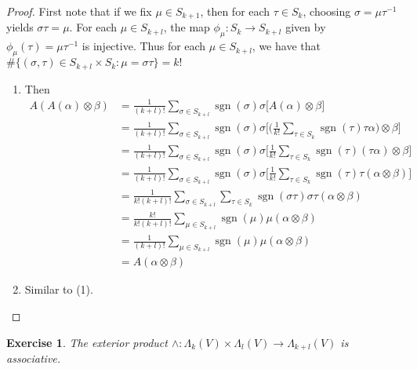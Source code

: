\documentclass[12pt]{amsart}
\newtheorem{ex}[thm]{Exercise}
\newcommand{\al}{\alpha}
\newcommand{\Lam}{\Lambda}
\newcommand{\sig}{\sigma}
\DeclareMathOperator{\sgn}{sgn}
\begin{document}
	\begin{proof}
		First note that if we fix $\mu \in S_{k+1}$, then for each $\tau \in S_k$, choosing $\sig = \mu \tau^{-1}$ yields $\sig \tau = \mu$. For each $\mu \in S_{k+l}$, the map $\phi_{\mu}: S_{k} \rightarrow S_{k+l}$ given by $\phi_{\mu}(\tau) = \mu \tau^{-1}$ is injective. Thus for each $\mu \in S_{k+l}$, we have that $\# \{ (\sig, \tau) \in S_{k+l} \times S_{k}: \mu = \sig \tau \} = k!$ 
		\begin{enumerate}
			\item Then
			\begin{align*}
				A(A(\al) \otimes \beta)
				&= \frac{1}{(k+l)!} \sum_{\sig \in S_{k+l}} \sgn(\sig) \sig \bigg [A(\al) \otimes \beta \bigg] \\
				&= \frac{1}{(k+l)!} \sum_{\sig \in S_{k+l}} \sgn(\sig) \sig \bigg[ \bigg( \frac{1}{k!}\sum_{\tau \in S_{k} } \sgn(\tau) \tau\al \bigg) \otimes \beta \bigg] \\
				&= \frac{1}{(k+l)!} \sum_{\sig \in S_{k+l}} \sgn(\sig) \sig \bigg[   \frac{1}{k!} \sum_{\tau \in S_{k} } \sgn(\tau) (\tau\al)  \otimes \beta \bigg] \\
				&= \frac{1}{(k+l)!} \sum_{\sig \in S_{k+l}} \sgn(\sig) \sig \bigg[  \frac{1}{k!} \sum_{\tau \in S_{k} } \sgn(\tau) \tau (\al  \otimes \beta) \bigg] \\
				&=  \frac{1}{k! (k+l)!}\sum_{\sig \in S_{k+l} } \sum_{\tau \in S_{k} } \sgn(\sig \tau) \sig \tau (\al  \otimes \beta) \\
				&=  \frac{k!}{k!(k+l)!} \sum_{\mu \in S_{k+l} }  \sgn(\mu) \mu (\al  \otimes \beta)\\
				&=  \frac{1}{(k+l)!} \sum_{\mu \in S_{k+l} }  \sgn(\mu) \mu (\al  \otimes \beta)\\
				&= A(\al \otimes \beta)
			\end{align*} 
		\item Similar to (1).
		\end{enumerate}
	\end{proof}

	\begin{ex}
		The exterior product $\wedge: \Lam_k(V) \times \Lam_l(V) \rightarrow \Lam_{k+l}(V)$ is associative. 
	\end{ex}
\end{document}
